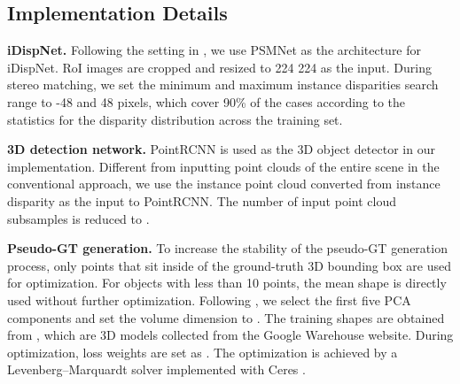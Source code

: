 \documentclass[10pt,twocolumn,letterpaper]{article}
\begin{document}
\subsection{Implementation Details}
\noindent\textbf{iDispNet.}\label{sec:imp-details-idispnet}
Following the setting in \cite{wang2019pseudo}, we use PSMNet \cite{changPyramidStereoMatching2018} as the architecture for iDispNet.
RoI images are cropped and resized to 224  224 as the input.
During stereo matching, we set the minimum and maximum instance disparities search range to -48 and 48 pixels, which cover 90\% of the cases according to the statistics for the disparity distribution across the training set.


\medskip\noindent\textbf{3D detection network.}
PointRCNN \cite{shi2019pointrcnn} is used as the 3D object detector in our implementation.
Different from inputting point clouds of the entire scene in the conventional approach, we use the instance point cloud converted from instance disparity as the input to PointRCNN.
The number of input point cloud subsamples is reduced to .

\medskip\noindent\textbf{Pseudo-GT generation.}
To increase the stability of the pseudo-GT generation process, only points that sit inside of the ground-truth 3D bounding box are used for optimization. For objects with less than 10 points, the mean shape is directly used without further optimization.
Following \cite{engelmann2016joint}, we select the first five PCA components and set the volume dimension to .
The training shapes are obtained from \cite{engelmann2016joint}, which are 3D models collected from the Google Warehouse website. 
During optimization, loss weights are set as .
The optimization is achieved by a Levenberg–Marquardt solver implemented with Ceres \cite{ceres-solver}.
\end{document}
